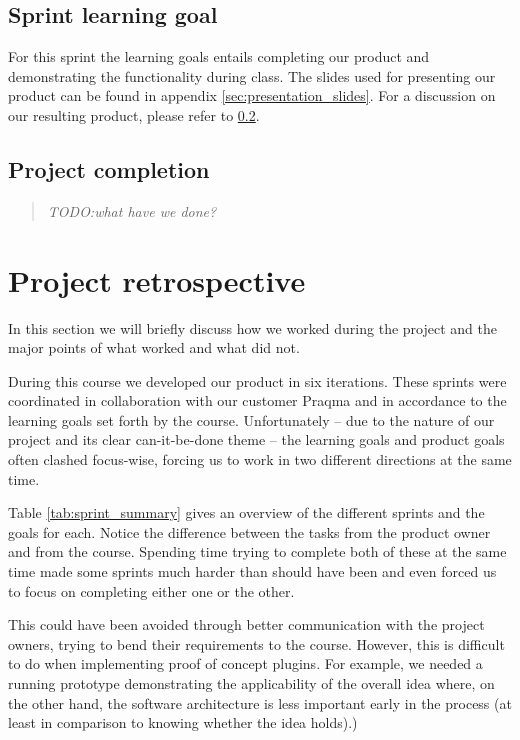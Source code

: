 \documentclass[a4paper,11pt]{article}
\begin{document}
\subsection{Sprint learning goal}
\label{sec:sprint_learning_goals}

For this sprint the learning goals entails completing our product and
demonstrating the functionality during class. The slides used for presenting our
product can be found in appendix \ref{sec:presentation_slides}. For a discussion
on our resulting product, please refer to \ref{sec:project_completion}.

\subsection{Project completion}
\label{sec:project_completion}
\begin{quote}
	\emph{TODO:what have we done?}
\end{quote}

\section{Project retrospective}
\label{sec:project_retrospective}

In this section we will briefly discuss how we worked during the project and the
major points of what worked and what did not.

During this course we developed our product in six iterations. These sprints
were coordinated in collaboration with our customer Praqma and in accordance to
the learning goals set forth by the course. Unfortunately -- due to the nature
of our project and its clear can-it-be-done theme -- the learning goals and
product goals often clashed focus-wise, forcing us to work in two different
directions at the same time. 

Table \ref{tab:sprint_summary} gives an overview of the different sprints and
the goals for each. Notice the difference between the tasks from the product
owner and from the course. Spending time trying to complete both of these at the
same time made some sprints much harder than should have been and even forced us
to focus on completing either one or the other. 

This could have been avoided through better communication with the project
owners, trying to bend their requirements to the course. However, this is
difficult to do when implementing proof of concept plugins. For example, we
needed a running prototype demonstrating the applicability of the overall idea
where, on the other hand, the software architecture is less important early in
the process (at least in comparison to knowing whether the idea holds).)
\end{document}
